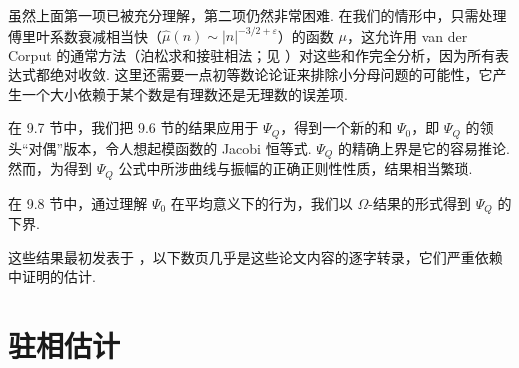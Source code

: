 虽然上面第一项已被充分理解，第二项仍然非常困难. 在我们的情形中，只需处理傅里叶系数衰减相当快（$\hat{\mu}(n) \sim |n|^{-3/2+\varepsilon}$）的函数 $\mu$，这允许用 van der Corput 的通常方法（泊松求和接驻相法；见 \cite{b215}）对这些和作完全分析，因为所有表达式都绝对收敛. 这里还需要一点初等数论论证来排除小分母问题的可能性，它产生一个大小依赖于某个数是有理数还是无理数的误差项.

在 9.7 节中，我们把 9.6 节的结果应用于 $\Psi_Q$，得到一个新的和 $\Psi_0$，即 $\Psi_Q$ 的领头``对偶''版本，令人想起模函数的 Jacobi 恒等式. $\Psi_Q$ 的精确上界是它的容易推论. 然而，为得到 $\Psi_Q$ 公式中所涉曲线与振幅的正确正则性性质，结果相当繁琐.

在 9.8 节中，通过理解 $\Psi_0$ 在平均意义下的行为，我们以 $\Omega$-结果的形式得到 $\Psi_Q$ 的下界.

这些结果最初发表于 \cite{b200,b201}，以下数页几乎是这些论文内容的逐字转录，它们严重依赖 \cite{b208} 中证明的估计.

\section{驻相估计}

